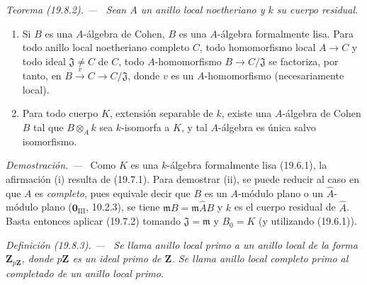\documentclass[10pt,oneside]{book}
\makeatletter
\newcommand{\setmanualcurrentlabel}[1]{\def\@currentlabel{#1}}
\newcommand{\oldpage}[2][]{%
  \setcounter{footnote}{0}%
  \marginpar{\scriptsize\textbf{#1}~|~#2}\ignorespaces}
\newenvironment{definition}[1][]{%
  \setmanualcurrentlabel{#1}\par\medskip\noindent\itshape Definición (#1). ---\ }{\par}
\newenvironment{theorem}[1][]{%
  \setmanualcurrentlabel{#1}\par\medskip\noindent\itshape Teorema (#1). ---\ }{\par}
\newenvironment{proof}{%
  \par\medskip\noindent\textit{Demostración. ---\ }}{\par}
\makeatother
\begin{document}
\oldpage[0\textsubscript{IV-1}]{110}

\begin{theorem}[19.8.2]
\label{0.19.8.2-es}
Sean $A$ un anillo local noetheriano y $k$ su cuerpo residual.
\begin{enumerate}
  \item[(i)] Si $B$ es una $A$-álgebra de Cohen, $B$ es una $A$-álgebra
  formalmente lisa. Para todo anillo local noetheriano completo $C$, todo
  homomorfismo local $A\to C$ y todo ideal $\mathfrak J\neq C$ de $C$,
  todo $A$-homomorfismo $B\to C/\mathfrak J$ se factoriza, por tanto, en
  $B\xrightarrow{v}C\to C/\mathfrak J$, donde $v$ es un $A$-homomorfismo
  (necesariamente local).
  \item[(ii)] Para todo cuerpo $K$, extensión separable de $k$, existe una
  $A$-álgebra de Cohen $B$ tal que $B\otimes_A k$ sea $k$-isomorfa a $K$,
  y tal $A$-álgebra es única salvo isomorfismo.
\end{enumerate}
\end{theorem}

\begin{proof}
Como $K$ es una $k$-álgebra formalmente lisa (19.6.1), la afirmación (i)
resulta de (19.7.1). Para demostrar (ii), se puede reducir al caso en que $A$ es
\emph{completo}, pues equivale decir que $B$ es un $A$-módulo plano
o un $\widehat A$-módulo plano ($\mathbf 0_{\mathrm{III}}$, 10.2.3), se tiene
$\mathfrak mB=\mathfrak m\widehat AB$ y $k$ es el cuerpo residual de
$\widehat A$. Basta entonces aplicar (19.7.2) tomando
$\mathfrak J=\mathfrak m$ y $B_0=K$ (y utilizando (19.6.1)).
\end{proof}

\begin{definition}[19.8.3]
\label{0.19.8.3-es}
Se llama anillo local \emph{primo} a un anillo local de la forma
$\mathbf Z_{p\mathbf Z}$, donde $p\mathbf Z$ es un ideal primo de $\mathbf Z$.
Se llama anillo local \emph{completo primo} al completado de un anillo local
primo.
\end{definition}
\end{document}

